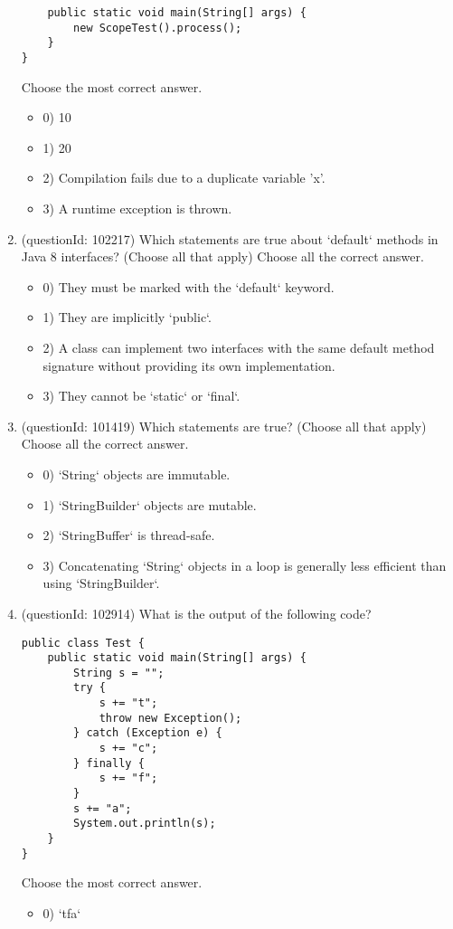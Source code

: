 \documentclass[12pt]{article}
\begin{document}
\begin{enumerate}[label=(\arabic*)]
\begin{verbatim}
    public static void main(String[] args) {
        new ScopeTest().process();
    }
}
\end{verbatim}
Choose the most correct answer. 
\begin{itemize}
\item 0) 10

\item 1) 20

\item 2) Compilation fails due to a duplicate variable 'x'.

\item 3) A runtime exception is thrown.

\end{itemize}
\item (questionId: 102217) Which statements are true about `default` methods in Java 8 interfaces? (Choose all that apply)
Choose all the correct answer.\begin{itemize}
\item 0) They must be marked with the `default` keyword.

\item 1) They are implicitly `public`.

\item 2) A class can implement two interfaces with the same default method signature without providing its own implementation.

\item 3) They cannot be `static` or `final`.

\end{itemize}
\item (questionId: 101419) Which statements are true? (Choose all that apply)
Choose all the correct answer.\begin{itemize}
\item 0) `String` objects are immutable.

\item 1) `StringBuilder` objects are mutable.

\item 2) `StringBuffer` is thread-safe.

\item 3) Concatenating `String` objects in a loop is generally less efficient than using `StringBuilder`.

\end{itemize}
\item (questionId: 102914) What is the output of the following code?
\begin{verbatim}
public class Test {
    public static void main(String[] args) {
        String s = "";
        try {
            s += "t";
            throw new Exception();
        } catch (Exception e) {
            s += "c";
        } finally {
            s += "f";
        }
        s += "a";
        System.out.println(s);
    }
}
\end{verbatim}
Choose the most correct answer. 
\begin{itemize}
\item 0) `tfa`


\end{itemize}
\end{enumerate}
\end{document}

